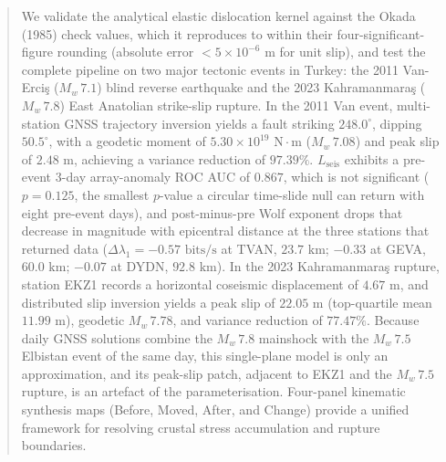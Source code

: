 \documentclass[11pt,a4paper]{article}
\begin{document}
\begin{abstract}
We validate the analytical elastic dislocation kernel against the Okada (1985) check values, which it reproduces to within their four-significant-figure rounding (absolute error $<5\times 10^{-6}\text{ m}$ for unit slip), and test the complete pipeline on two major tectonic events in Turkey: the 2011 Van-Erci\c{s} ($M_w\,7.1$) blind reverse earthquake and the 2023 Kahramanmara\c{s} ($M_w\,7.8$) East Anatolian strike-slip rupture. In the 2011 Van event, multi-station GNSS trajectory inversion yields a fault striking $248.0^\circ$, dipping $50.5^\circ$, with a geodetic moment of $5.30\times 10^{19}\text{ N}\cdot\text{m}$ ($M_w\,7.08$) and peak slip of $2.48\text{ m}$, achieving a variance reduction of $97.39\%$. $L_{\text{seis}}$ exhibits a pre-event 3-day array-anomaly ROC AUC of $0.867$, which is not significant ($p = 0.125$, the smallest $p$-value a circular time-slide null can return with eight pre-event days), and post-minus-pre Wolf exponent drops that decrease in magnitude with epicentral distance at the three stations that returned data ($\Delta \lambda_1 = -0.57\text{ bits/s}$ at TVAN, $23.7\text{ km}$; $-0.33$ at GEVA, $60.0\text{ km}$; $-0.07$ at DYDN, $92.8\text{ km}$). In the 2023 Kahramanmara\c{s} rupture, station EKZ1 records a horizontal coseismic displacement of $4.67\text{ m}$, and distributed slip inversion yields a peak slip of $22.05\text{ m}$ (top-quartile mean $11.99\text{ m}$), geodetic $M_w\,7.78$, and variance reduction of $77.47\%$. Because daily GNSS solutions combine the $M_w\,7.8$ mainshock with the $M_w\,7.5$ Elbistan event of the same day, this single-plane model is only an approximation, and its peak-slip patch, adjacent to EKZ1 and the $M_w\,7.5$ rupture, is an artefact of the parameterisation. Four-panel kinematic synthesis maps (Before, Moved, After, and Change) provide a unified framework for resolving crustal stress accumulation and rupture boundaries.
\end{abstract}
\end{document}
